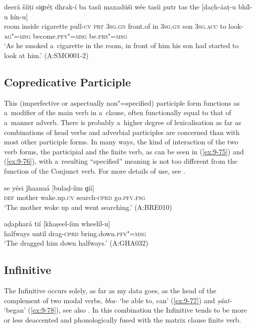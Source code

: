 \begin{exe}
\ex
\label{ex:9-74}
\gll deerá šíiṭi siɡréṭ dhrak-í ba tasíi maxadúši wée tasíi putr tas the [dac̣h-áaṭ-u bhíl-u hín-u] \\
room inside cigarette pull-\textsc{cv} \textsc{prt} \textsc{3sg.gn} front.of in \textsc{3sg.gn} son \textsc{3sg.acc} to look-\textsc{ag"=msg} become.\textsc{pfv"=msg} be.\textsc{prs"=msg } \\
\glt `As he smoked a~cigarette in the room, in front of him his son had started to look at him.' (A:SMO001-2)
\end{exe}

\subsection{Copredicative Participle}
\label{subsec:9-3-5}

This (imperfective or aspectually non"=specified) participle form functions as a~modifier of the main verb in a~clause, often functionally equal to that of a~manner adverb. There is probably a~higher degree of lexicalisation as far as combinations of head verbs and adverbial participles are concerned than with most other participle forms. In many ways, the kind of interaction of the two verb forms, the participial and the finite verb, as can be seen in (\ref{ex:9-75}) and (\ref{ex:9-76}), with a~resulting ``specified'' meaning is not too different from the function of the Conjunct verb. For more details of use, see . 

\begin{exe}
\ex
\label{ex:9-75}
\gll se yéei ǰhaanaá [bulaḍ-íim ɡíi]  \\
\textsc{def} mother wake.up.\textsc{cv} search-\textsc{cprd} go.\textsc{pfv.fsg} \\
\glt `The mother woke up and went searching.' (A:BRE010)

\ex
\label{ex:9-76}
\gll aḍaphará tií [khaṣeel-íim wheelíl-u] \\
halfways until drag-\textsc{cprd} bring.down.\textsc{pfv"=msg} \\
\glt `The dragged him down halfways.' (A:GHA032)
\end{exe}

\subsection{Infinitive}
\label{subsec:9-3-6}

The Infinitive occurs solely, as far as my data goes, as the head of the complement of two modal
verbs, \textit{bha-} `be able to, can' (\ref{ex:9-77}) and \textit{ṣáat-} `began' (\ref{ex:9-78}), see also
. In this combination the Infinitive tends to be more or less deaccented and phonologically
fused with the matrix clause finite verb.

